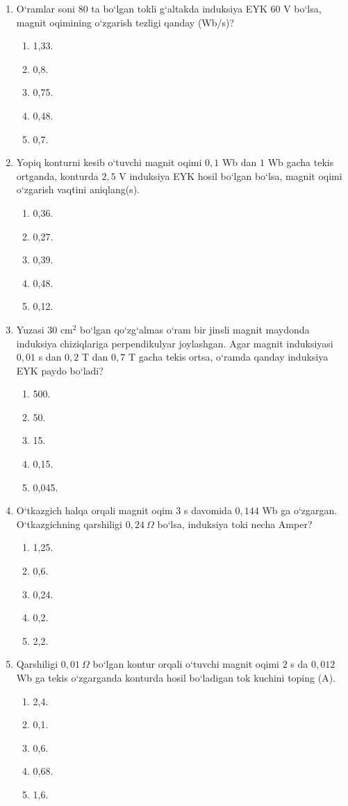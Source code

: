 \begin{enumerate}
\item O‘ramlar soni $80$ ta bo‘lgan tokli g‘altakda induksiya EYK $60$ V bo‘lsa, magnit oqimining o‘zgarish tezligi qanday (Wb/s)?
\begin{enumerate}[label=\Alph*)]
\item 1,33.
\item 0,8.
\item 0,75.
\item 0,48.
\item 0,7.
\end{enumerate}

\item Yopiq konturni kesib o‘tuvchi magnit oqimi $0,1$ Wb dan $1$ Wb gacha tekis ortganda, konturda $2,5$ V induksiya EYK hosil bo‘lgan bo‘lsa, magnit oqimi o‘zgarish vaqtini aniqlang(s).
\begin{enumerate}[label=\Alph*)]
\item 0,36.
\item 0,27.
\item 0,39.
\item 0,48.
\item 0,12.
\end{enumerate}

\item Yuzasi $30$ cm$^2$ bo‘lgan qo‘zg‘almas o‘ram bir jinsli magnit maydonda induksiya chiziqlariga perpendikulyar joylashgan. Agar magnit induksiyasi $0,01$ s dan $0,2$ T dan $0,7$ T gacha tekis ortsa, o‘ramda qanday induksiya EYK paydo bo‘ladi?
\begin{enumerate}[label=\Alph*)]
\item 500.
\item 50.
\item 15.
\item 0,15.
\item 0,045.
\end{enumerate}

\item O‘tkazgich halqa orqali magnit oqim $3$ s davomida $0,144$ Wb ga o‘zgargan. O‘tkazgichning qarshiligi $0,24~\Omega$ bo‘lsa, induksiya toki necha Amper?
\begin{enumerate}[label=\Alph*)]
\item 1,25.
\item 0,6.
\item 0,24.
\item 0,2.
\item 2,2.
\end{enumerate}

\item Qarshiligi $0,01~\Omega$ bo‘lgan kontur orqali o‘tuvchi magnit oqimi $2$ s da $0,012$ Wb ga tekis o‘zgarganda konturda hosil bo‘ladigan tok kuchini toping (A).
\begin{enumerate}[label=\Alph*)]
\item 2,4.
\item 0,1.
\item 0,6.
\item 0,68.
\item 1,6.
\end{enumerate}


\end{enumerate}
